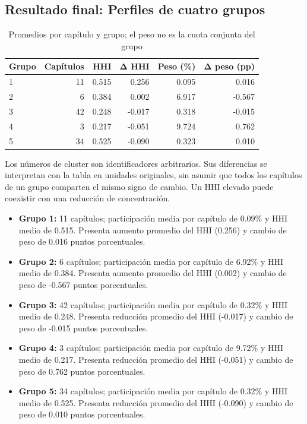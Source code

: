 \documentclass[
  spanish,
  10pt,
]{article}
\begin{document}
\subsection{Resultado final: Perfiles de cuatro
grupos}\label{resultado-final-perfiles-de-cuatro-grupos}

\begin{table}

\caption{\label{tab:perfiles-k5}Promedios por capítulo y grupo; el peso no es la cuota conjunta del grupo}
\centering
\begin{tabular}[t]{lrrrrr}
\toprule
Grupo & Capítulos & HHI & Δ HHI & Peso (\%) & Δ peso (pp)\\
\midrule
1 & 11 & 0.515 & 0.256 & 0.095 & 0.016\\
2 & 6 & 0.384 & 0.002 & 6.917 & -0.567\\
3 & 42 & 0.248 & -0.017 & 0.318 & -0.015\\
4 & 3 & 0.217 & -0.051 & 9.724 & 0.762\\
5 & 34 & 0.525 & -0.090 & 0.323 & 0.010\\
\bottomrule
\end{tabular}
\end{table}

Los números de cluster son identificadores arbitrarios. Sus diferencias
se interpretan con la tabla en unidades originales, sin asumir que todos
los capítulos de un grupo comparten el mismo signo de cambio. Un HHI
elevado puede coexistir con una reducción de concentración.

\begin{itemize}
\item
  \textbf{Grupo 1:} 11 capítulos; participación media por capítulo de
  0.09\% y HHI medio de 0.515. Presenta aumento promedio del HHI (0.256)
  y cambio de peso de 0.016 puntos porcentuales.
\item
  \textbf{Grupo 2:} 6 capítulos; participación media por capítulo de
  6.92\% y HHI medio de 0.384. Presenta aumento promedio del HHI (0.002)
  y cambio de peso de -0.567 puntos porcentuales.
\item
  \textbf{Grupo 3:} 42 capítulos; participación media por capítulo de
  0.32\% y HHI medio de 0.248. Presenta reducción promedio del HHI
  (-0.017) y cambio de peso de -0.015 puntos porcentuales.
\item
  \textbf{Grupo 4:} 3 capítulos; participación media por capítulo de
  9.72\% y HHI medio de 0.217. Presenta reducción promedio del HHI
  (-0.051) y cambio de peso de 0.762 puntos porcentuales.
\item
  \textbf{Grupo 5:} 34 capítulos; participación media por capítulo de
  0.32\% y HHI medio de 0.525. Presenta reducción promedio del HHI
  (-0.090) y cambio de peso de 0.010 puntos porcentuales.
\end{itemize}
\end{document}
